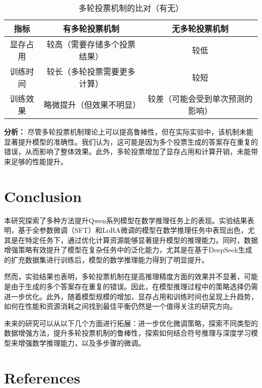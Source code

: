 \documentclass{article}
\begin{document}
\begin{table}[H]
  \caption{多轮投票机制的比对（有无）}
  \label{voting-mechanism-comparison}
  \centering
  \begin{tabular}{|c|c|c|}
    \hline
    \textbf{指标} & \textbf{有多轮投票机制} & \textbf{无多轮投票机制} \\ \hline
    显存占用 & 较高（需要存储多个投票结果） & 较低 \\ \hline
    训练时间 & 较长（多轮投票需要更多计算） & 较短 \\ \hline
    训练效果 & 略微提升（但效果不明显） & 较差（可能会受到单次预测的影响） \\ \hline
  \end{tabular}
\end{table}

\textbf{分析：}
尽管多轮投票机制理论上可以提高鲁棒性，但在实际实验中，该机制未能显著提升模型的准确性。我们认为，这可能是因为多个投票生成的答案存在重复的错误，从而影响了整体效果。此外，多轮投票增加了显存占用和计算开销，未能带来足够的性能提升。


  






\section{Conclusion}

本研究探索了多种方法提升Qwen系列模型在数学推理任务上的表现。实验结果表明，基于全参数微调（SFT）和LoRA微调的模型在数学推理任务中表现出色，尤其是在特定任务下，通过优化计算资源能够显著提升模型的推理能力。同时，数据增强策略有效提升了模型在复杂任务中的泛化能力，尤其是在基于DeepSeek生成的扩充数据集进行训练后，模型的数学推理能力得到了明显提升。

然而，实验结果也表明，多轮投票机制在提高推理精度方面的效果并不显著，可能是由于生成的多个答案存在重复的错误。因此，在模型推理过程中的策略选择仍需进一步优化。此外，随着模型规模的增加，显存占用和训练时间也呈现上升趋势，如何在性能和资源消耗之间找到最佳平衡仍然是一个值得关注的研究方向。

未来的研究可以从以下几个方面进行拓展：进一步优化微调策略，探索不同类型的数据增强方法，提升多轮投票机制的鲁棒性，探索如何结合符号推理与深度学习模型来增强数学推理能力，以及多步骤的微调。




\section{References}
\end{document}
